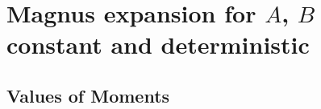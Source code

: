 \section{Magnus expansion for $A$, $B$ constant and deterministic}
\subsection{Values of Moments}
	
	
	
	
